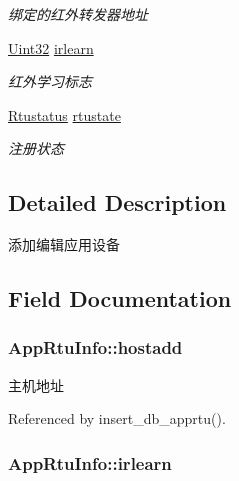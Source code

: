 \begin{DoxyCompactItemize}
\begin{DoxyCompactList}\small\item\em 绑定的红外转发器地址 \end{DoxyCompactList}\item 
\hyperlink{base_8h_a60cf7b3c038ce37a50796e8eaddf0b5f}{Uint32} \hyperlink{structAppRtuInfo_a079a986dc0f08810d6f97c1a0b5c4bb3}{irlearn}
\begin{DoxyCompactList}\small\item\em 红外学习标志 \end{DoxyCompactList}\item 
\hyperlink{dbbase_8h_afec5109c9a49125c493619b015292bb0}{Rtustatus} \hyperlink{structAppRtuInfo_a4b7f6869eb4bdbe622f2cc6050d31e1f}{rtustate}
\begin{DoxyCompactList}\small\item\em 注册状态 \end{DoxyCompactList}\end{DoxyCompactItemize}


\subsection{Detailed Description}
添加编辑应用设备 

\subsection{Field Documentation}
\hypertarget{structAppRtuInfo_a15bdb2e241557f3f7326f35e1599568a}{
\subsubsection[{hostadd}]{ App\-Rtu\-Info\-::hostadd}}\label{structAppRtuInfo_a15bdb2e241557f3f7326f35e1599568a}


主机地址 



Referenced by insert\-\_\-db\-\_\-apprtu().

\hypertarget{structAppRtuInfo_a079a986dc0f08810d6f97c1a0b5c4bb3}{
\subsubsection[{irlearn}]{ App\-Rtu\-Info\-::irlearn}}\label{structAppRtuInfo_a079a986dc0f08810d6f97c1a0b5c4bb3}


